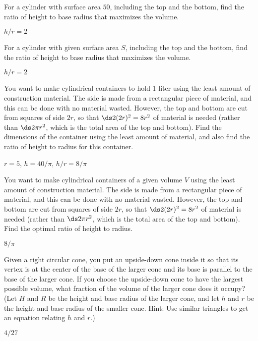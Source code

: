 \begin{exercises}
\begin{exercise}
For a cylinder with surface area $50$, including 
the top and the bottom, find the ratio of height to
base radius that maximizes the volume.
\begin{answer} $h/r=2$
\end{answer}\end{exercise}

\begin{exercise}
For a cylinder with given surface area $S$, including 
the top and the bottom, find the ratio of height to
base radius that maximizes the volume.
\begin{answer} $h/r=2$
\end{answer}\end{exercise}

\begin{exercise}
You want to make cylindrical containers to hold 1 liter using the
least amount of construction material.  The side is made from a
rectangular piece of material, and this can be done with no material
wasted.  However, the top and bottom are cut from squares of side $2r$, so
that $\ds 2(2r)^2=8r^2$ of material is needed (rather than $\ds 2\pi r^2$, which is
the total area of the top and bottom).  Find the dimensions of the
container using the least amount of material, and also find the
ratio of height to
radius for this container.
\begin{answer} $r=5$, $h=40/\pi$, $h/r=8/\pi$
\end{answer}\end{exercise}

\begin{exercise}
You want to make cylindrical containers of a given volume $V$ using the
least amount of construction material.  The side is made from a
rectangular piece of material, and this can be done with no material
wasted.  However, the top and bottom are cut from squares of side $2r$, so
that $\ds 2(2r)^2=8r^2$ of material is needed (rather than $\ds 2\pi r^2$, which is
the total area of the top and bottom).  Find the optimal ratio of height to
radius.
\begin{answer} $8/\pi$
\end{answer}\end{exercise}

\begin{exercise}
Given a right circular cone, you put an upside-down cone inside it so that
its vertex is at the center of the base of the larger cone and its base is
parallel to the base of the larger cone.  If you choose the upside-down
cone to have the largest possible volume, what fraction of the volume of
the larger cone does it occupy?  (Let $H$ and $R$ be the height and base
radius of the larger cone, and let $h$ and $r$ be the height and base
radius of the smaller cone.  Hint: Use similar triangles to get an equation
relating $h$ and $r$.)
\begin{answer} $4/27$
\end{answer}\end{exercise}


\end{exercises}
